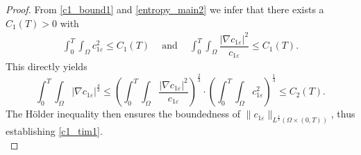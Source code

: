 \documentclass[a4paper,10pt]{article}
\theoremstyle{definition}
\begin{document}
\begin{proof}
  From \eqref{c1_bound1} and \eqref{entropy_main2} we infer that there exists a $C_1(T) > 0$ with
  \begin{align*}
    \int_0^{T} \int_\Omega c_{1\varepsilon}^2 \leq C_1(T) \quad ~\text{and}~ \quad \int_0^T \int_\Omega \dfrac{|\nabla c_{1 \varepsilon}|^2}{c_{1\varepsilon}} \leq C_1(T).
  \end{align*}
  This directly yields
  \begin{equation}
    \label{c1_tres1}
    \int_0^T \int_\Omega |\nabla c_{1\varepsilon}|^{\frac{4}{3}} \leq \left(\int_0^T \int_\Omega \dfrac{|\nabla c_{1 \varepsilon}|^2}{c_{1\varepsilon}}\right)^{\frac{2}{3}} \cdot  \left( \int_0^{T} \int_\Omega c_{1\varepsilon}^2 \right)^{\frac{1}{3}} \leq C_2(T).
  \end{equation}
  The H\"{o}lder inequality then ensures the boundedness of $\|c_{1\varepsilon}\|_{L^{\frac{4}{3}}(\Omega \times (0, T))}$, thus establishing \eqref{c1_tim1}.\\[-2ex]
  

\end{proof}
\end{document}
